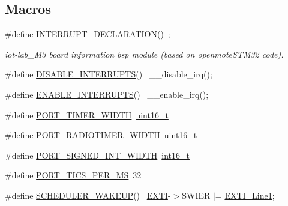 \subsection*{Macros}
\begin{DoxyCompactItemize}
\item 
\#define \hyperlink{iot-lab___m3_2board__info_8h_aafcaa3cb5de374b74117d66a78e6589b}{I\+N\+T\+E\+R\+R\+U\+P\+T\+\_\+\+D\+E\+C\+L\+A\+R\+A\+T\+I\+ON}()~;
\begin{DoxyCompactList}\small\item\em iot-\/lab\+\_\+\+M3 board information bsp module (based on openmote\+S\+T\+M32 code). \end{DoxyCompactList}\item 
\#define \hyperlink{iot-lab___m3_2board__info_8h_a8eb672ccdf01b424c5e6d085013fd47f}{D\+I\+S\+A\+B\+L\+E\+\_\+\+I\+N\+T\+E\+R\+R\+U\+P\+TS}()    ~\+\_\+\+\_\+disable\+\_\+irq();
\item 
\#define \hyperlink{iot-lab___m3_2board__info_8h_a067b9176075d532963a05e0422d2de56}{E\+N\+A\+B\+L\+E\+\_\+\+I\+N\+T\+E\+R\+R\+U\+P\+TS}()      ~\+\_\+\+\_\+enable\+\_\+irq();
\item 
\#define \hyperlink{iot-lab___m3_2board__info_8h_abe66b9c1c60db84f2a99f2b827275f24}{P\+O\+R\+T\+\_\+\+T\+I\+M\+E\+R\+\_\+\+W\+I\+D\+TH}~\hyperlink{_p_e___types_8h_a1f1825b69244eb3ad2c7165ddc99c956}{uint16\+\_\+t}
\item 
\#define \hyperlink{iot-lab___m3_2board__info_8h_ac16e02aadd749b2d27638bed1a805a59}{P\+O\+R\+T\+\_\+\+R\+A\+D\+I\+O\+T\+I\+M\+E\+R\+\_\+\+W\+I\+D\+TH}~\hyperlink{_p_e___types_8h_a1f1825b69244eb3ad2c7165ddc99c956}{uint16\+\_\+t}
\item 
\#define \hyperlink{iot-lab___m3_2board__info_8h_a07a9f9de95908017f808cbf0c474828e}{P\+O\+R\+T\+\_\+\+S\+I\+G\+N\+E\+D\+\_\+\+I\+N\+T\+\_\+\+W\+I\+D\+TH}~\hyperlink{_p_e___types_8h_a932e6ccc3d54c58f761c1aead83bd6d7}{int16\+\_\+t}
\item 
\#define \hyperlink{iot-lab___m3_2board__info_8h_a71ac4f01b5932487c50c4f1a4b821a92}{P\+O\+R\+T\+\_\+\+T\+I\+C\+S\+\_\+\+P\+E\+R\+\_\+\+MS}~32
\item 
\#define \hyperlink{iot-lab___m3_2board__info_8h_a279c683842015c43581411bfa8362081}{S\+C\+H\+E\+D\+U\+L\+E\+R\+\_\+\+W\+A\+K\+E\+UP}()                                ~\hyperlink{group___peripheral__declaration_ga9189e770cd9b63dadd36683eb9843cac}{E\+X\+TI}-\/$>$S\+W\+I\+ER $\vert$= \hyperlink{openmotestm_2library_2inc_2stm32f10x__exti_8h_ae7c6ab2a0880ce3810641ee0585104cd}{E\+X\+T\+I\+\_\+\+Line1};

\end{DoxyCompactItemize}
